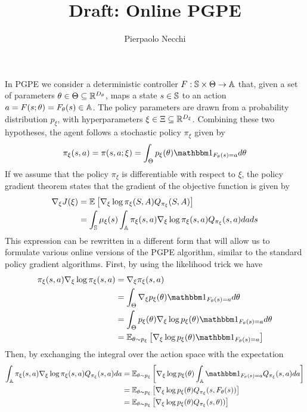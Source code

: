\documentclass[a4paper,11pt]{article}
\begin{document}
\title{Draft: Online PGPE}
\author{Pierpaolo Necchi}
\maketitle

In PGPE we consider a deterministic controller $F: \S \times \Theta \to \A$
that, given a set of parameters $\theta \in \Theta \subseteq \R^{D_\theta}$,
maps a state $s \in \S$ to an action $a = F(s; \theta) = F_\theta(s) \in \A$. 
The policy parameters are drawn from a probability distribution $p_\xi$, with
hyperparameters $\xi \in \Xi \subseteq \R^{D_\xi}$. Combining these two
hypotheses, the agent follows a stochastic policy $\pi_\xi$ given by
\begin{equation}
	\pi_\xi(s,a) = \pi(s, a; \xi) =	\int_\Theta p_\xi(\theta)
	\ind{F_{\theta}(s)=a} d\theta
\end{equation}
If we assume that the policy $\pi_\xi$ is differentiable with respect to $\xi$,
the policy gradient theorem states that the gradient of the objective function
is given by 
\begin{equation}\label{eq:policy_gradient}
	\begin{split}
		\nabla_\xi J(\xi) &= \E{\nabla_\xi \log \pi_\xi(S,A) Q_{\pi_\xi}(S,A)}\\
						  &= \int_{\S} \mu_{\xi}(s) \int_{\A} \pi_{\xi}(s, a)
		\nabla_{\xi} \log \pi_{\xi}(s,a) Q_{\pi_\xi}(s,a) da ds\\
	\end{split}
\end{equation}
This expression can be rewritten in a different form that will allow us to
formulate various online versions of the PGPE algorithm, similar to the
standard policy gradient algorithms. First, by using the likelihood trick we
have
\begin{equation*}
	\begin{split}
		\pi_\xi(s,a) \nabla_\xi \log \pi_\xi(s,a) &= \nabla_\xi \pi_\xi(s,a) \\
			&= \int_\Theta \nabla_\xi p_\xi(\theta) \ind{F_\theta(s)=a} d\theta
		\\
		&= \int_\Theta p_\xi(\theta) \nabla_\xi \log p_\xi(\theta) \ind{F_\theta(s)=a} d\theta
		\\
		&= \E[\theta \sim p_\xi]{\nabla_\xi \log p_\xi(\theta) \ind{F_\theta(s)=a}}
	\end{split}
\end{equation*}
Then, by exchanging the integral over the action space with the expectation
\begin{equation*}
	\begin{split}
		\int_\A \pi_\xi(s,a) \nabla_\xi \log \pi_\xi(s,a) Q_{\pi_\xi}(s,a) da 
			&= \E[\theta \sim p_\xi]{\nabla_\xi \log p_\xi(\theta) \int_\A \ind{F_\theta(s)=a}
			Q_{\pi_\xi}(s,a) da}\\
			&= \E[\theta \sim p_\xi]{\nabla_\xi \log p_\xi(\theta) Q_{\pi_\xi}(s, F_\theta(s))}\\
			&= \E[\theta \sim p_\xi]{\nabla_\xi \log p_\xi(\theta) Q_{\pi_\xi}(s, \theta))}
	\end{split}
\end{equation*}
\end{document}
